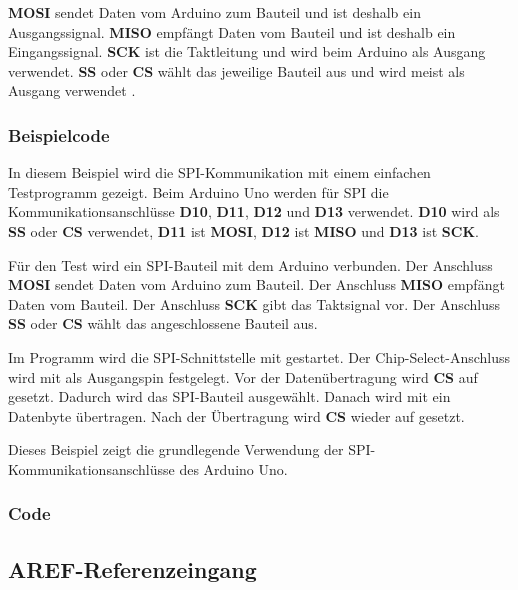 \textbf{MOSI} sendet Daten vom Arduino zum Bauteil und ist deshalb ein Ausgangssignal. \textbf{MISO} empfängt Daten vom Bauteil und ist deshalb ein Eingangssignal. \textbf{SCK} ist die Taktleitung und wird beim Arduino als Ausgang verwendet. \textbf{SS} oder \textbf{CS} wählt das jeweilige Bauteil aus und wird meist als Ausgang verwendet \cite{arduino:language-reference}.


\subsubsection{Beispielcode}

In diesem Beispiel wird die SPI-Kommunikation mit einem einfachen Testprogramm gezeigt. Beim Arduino Uno werden für SPI die Kommunikationsanschlüsse \textbf{D10}, \textbf{D11}, \textbf{D12} und \textbf{D13} verwendet. \textbf{D10} wird als \textbf{SS} oder \textbf{CS} verwendet, \textbf{D11} ist \textbf{MOSI}, \textbf{D12} ist \textbf{MISO} und \textbf{D13} ist \textbf{SCK}.

Für den Test wird ein SPI-Bauteil mit dem Arduino verbunden. Der Anschluss \textbf{MOSI} sendet Daten vom Arduino zum Bauteil. Der Anschluss \textbf{MISO} empfängt Daten vom Bauteil. Der Anschluss \textbf{SCK} gibt das Taktsignal vor. Der Anschluss \textbf{SS} oder \textbf{CS} wählt das angeschlossene Bauteil aus.

Im Programm wird die SPI-Schnittstelle mit  gestartet. Der Chip-Select-Anschluss wird mit  als Ausgangspin festgelegt. Vor der Datenübertragung wird \textbf{CS} auf  gesetzt. Dadurch wird das SPI-Bauteil ausgewählt. Danach wird mit  ein Datenbyte übertragen. Nach der Übertragung wird \textbf{CS} wieder auf  gesetzt.

Dieses Beispiel zeigt die grundlegende Verwendung der SPI-Kommunikationsanschlüsse des Arduino Uno.

\subsubsection{Code}

{
	\label{lst:SPIGrundtest}
}


\subsection{AREF-Referenzeingang}



